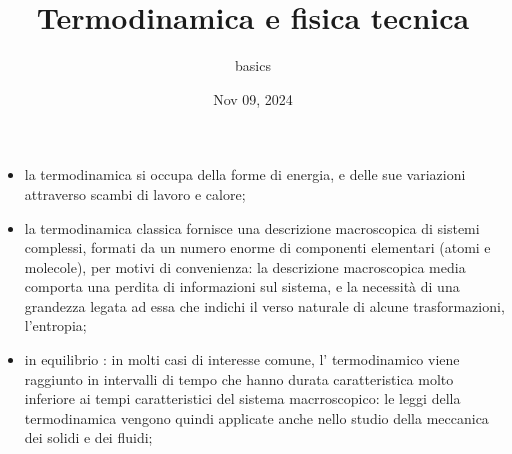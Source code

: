 \documentclass[letterpaper,10pt,english]{jupyterBook}
\title{Termodinamica e fisica tecnica}
\date{Nov 09, 2024}
\author{basics}
\begin{document}
\pagestyle{empty}
\sphinxmaketitle
\pagestyle{plain}
\sphinxtableofcontents
\pagestyle{normal}
\label{\detokenize{intro::doc}}


\sphinxAtStartPar
{}
\begin{itemize}
\item {} 
\sphinxAtStartPar
la termodinamica si occupa della forme di energia, e delle sue variazioni attraverso scambi di lavoro e calore;

\item {} 
\sphinxAtStartPar
la termodinamica classica fornisce una descrizione macroscopica di sistemi complessi, formati da un numero enorme di componenti elementari (atomi e molecole), per motivi di convenienza: la descrizione macroscopica media comporta una perdita di informazioni sul sistema, e la necessità di una grandezza legata ad essa che indichi il verso naturale di alcune trasformazioni, l’entropia;

\item {} 
\sphinxAtStartPar
in equilibrio : in molti casi di interesse comune, l’ termodinamico  viene raggiunto in intervalli di tempo che hanno durata caratteristica molto inferiore ai tempi caratteristici del sistema macrroscopico: le leggi della termodinamica vengono quindi applicate anche nello studio della meccanica dei solidi e dei fluidi;

\end{itemize}
\end{document}
